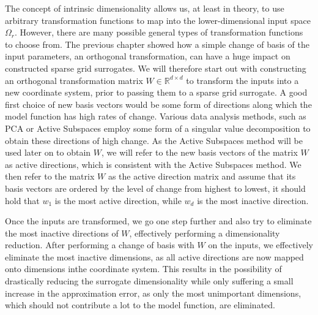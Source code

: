 \documentclass[
  a4paper,  %
  twoside,  %
  bibliography=totoc,
  headsepline,
  cleardoublepage=empty,
  parskip=half,
  draft=false
]{scrbook}
\begin{document}
The concept of intrinsic dimensionality allows us, at least in theory, to use arbitrary transformation functions to map into the lower-dimensional input space $\Omega_r$.
However, there are many possible general types of transformation functions to choose from.
The previous chapter showed how a simple change of basis of the input parameters, \ie an orthogonal transformation, can have a huge impact on constructed sparse grid surrogates.
We will therefore start out with constructing an orthogonal transformation matrix $W \in \mathds{R}^{d \times d}$ to transform the inputs into a new coordinate system, prior to passing them to a sparse grid surrogate.
A good first choice of new basis vectors would be some form of directions along which the model function has high rates of change.
Various data analysis methods, such as PCA \cite{Abdi2010} or Active Subspaces \cite{Constantine2015} employ some form of a singular value decomposition to obtain these directions of high change.
As the Active Subspaces method will be used later on to obtain $W$, we will refer to the new basis vectors of the matrix $W$ as active directions, which is consistent with the Active Subspaces method.
We then refer to the matrix $W$ as the active direction matrix and assume that its basis vectors are ordered by the level of change from highest to lowest, \ie it should hold that $w_1$ is the most active direction, while $w_d$ is the most inactive direction.

Once the inputs are transformed, we go one step further and also try to eliminate the most inactive directions of $W$, effectively performing a dimensionality reduction.
After performing a change of basis with $W$ on the inputs, we effectively eliminate the most inactive dimensions, as all active directions are now mapped onto dimensions inthe coordinate system.
This results in the possibility of drastically reducing the surrogate dimensionality while only suffering a small increase in the approximation error, as only the most unimportant dimensions, which should not contribute a lot to the model function, are eliminated.
\end{document}
